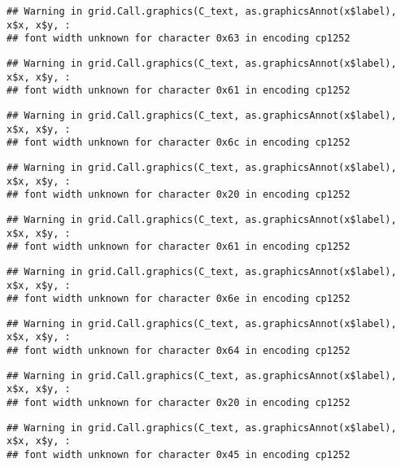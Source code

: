 \documentclass[
]{article}
\begin{document}
\begin{verbatim}
## Warning in grid.Call.graphics(C_text, as.graphicsAnnot(x$label), x$x, x$y, :
## font width unknown for character 0x63 in encoding cp1252
\end{verbatim}

\begin{verbatim}
## Warning in grid.Call.graphics(C_text, as.graphicsAnnot(x$label), x$x, x$y, :
## font width unknown for character 0x61 in encoding cp1252
\end{verbatim}

\begin{verbatim}
## Warning in grid.Call.graphics(C_text, as.graphicsAnnot(x$label), x$x, x$y, :
## font width unknown for character 0x6c in encoding cp1252
\end{verbatim}

\begin{verbatim}
## Warning in grid.Call.graphics(C_text, as.graphicsAnnot(x$label), x$x, x$y, :
## font width unknown for character 0x20 in encoding cp1252
\end{verbatim}

\begin{verbatim}
## Warning in grid.Call.graphics(C_text, as.graphicsAnnot(x$label), x$x, x$y, :
## font width unknown for character 0x61 in encoding cp1252
\end{verbatim}

\begin{verbatim}
## Warning in grid.Call.graphics(C_text, as.graphicsAnnot(x$label), x$x, x$y, :
## font width unknown for character 0x6e in encoding cp1252
\end{verbatim}

\begin{verbatim}
## Warning in grid.Call.graphics(C_text, as.graphicsAnnot(x$label), x$x, x$y, :
## font width unknown for character 0x64 in encoding cp1252
\end{verbatim}

\begin{verbatim}
## Warning in grid.Call.graphics(C_text, as.graphicsAnnot(x$label), x$x, x$y, :
## font width unknown for character 0x20 in encoding cp1252
\end{verbatim}

\begin{verbatim}
## Warning in grid.Call.graphics(C_text, as.graphicsAnnot(x$label), x$x, x$y, :
## font width unknown for character 0x45 in encoding cp1252
\end{verbatim}
\end{document}
